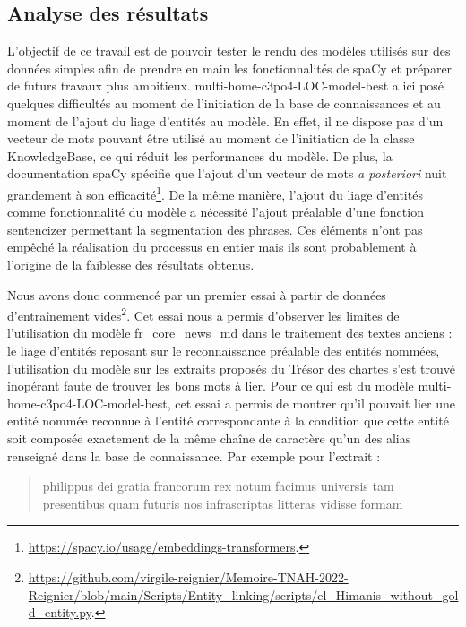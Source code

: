 \documentclass[a4paper,12pt,twoside]{book}
\begin{document}
	\subsection{Analyse des résultats}
	
	L'objectif de ce travail est de pouvoir tester le rendu des modèles utilisés sur des données simples afin de prendre en main les fonctionnalités de spaCy et préparer de futurs travaux plus ambitieux. \og multi-home-c3po4-LOC-model-best\fg{} a ici posé quelques difficultés au moment de l'initiation de la base de connaissances et au moment de l'ajout du liage d'entités au modèle. En effet, il ne dispose pas d'un vecteur de mots pouvant être utilisé au moment de l'initiation de la classe \og KnowledgeBase\fg{}, ce qui réduit les performances du modèle. De plus, la documentation spaCy spécifie que l'ajout d'un vecteur de mots \textit{a posteriori} nuit grandement à son efficacité\footnote{\url{https://spacy.io/usage/embeddings-transformers}.}. De la même manière, l'ajout du liage d'entités comme fonctionnalité du modèle a nécessité l'ajout préalable d'une fonction \og sentencizer\fg{} permettant la segmentation des phrases. Ces éléments n'ont pas empêché la réalisation du processus en entier mais ils sont probablement à l'origine de la faiblesse des résultats obtenus. 
	
	Nous avons donc commencé par un premier essai à partir de données d'entraînement vides\footnote{\url{https://github.com/virgile-reignier/Memoire-TNAH-2022-Reignier/blob/main/Scripts/Entity_linking/scripts/el_Himanis_without_gold_entity.py}.}. Cet essai nous a permis d'observer les limites de l'utilisation du modèle \og fr\_core\_news\_md\fg{} dans le traitement des textes anciens : le liage d'entités reposant sur le reconnaissance préalable des entités nommées, l'utilisation du modèle sur les extraits proposés du Trésor des chartes s'est trouvé inopérant faute de trouver les bons mots à lier. Pour ce qui est du modèle \og multi-home-c3po4-LOC-model-best\fg{}, cet essai a permis de montrer qu'il pouvait lier une entité nommée reconnue à l'entité correspondante à la condition que cette entité soit composée exactement de la même chaîne de caractère qu'un des alias renseigné dans la base de connaissance. Par exemple pour l'extrait :
	
	\begin{quotation}
		philippus dei gratia francorum rex notum facimus universis tam presentibus quam futuris nos infrascriptas litteras vidisse formam
	\end{quotation}
\end{document}
